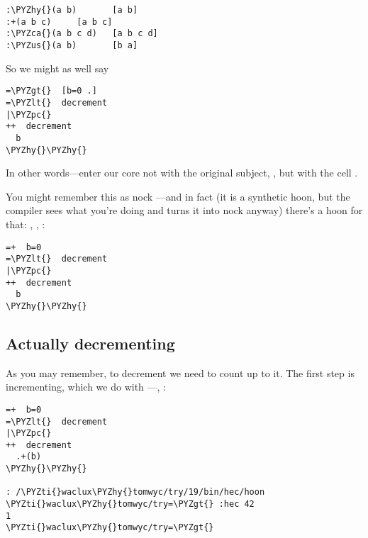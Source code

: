 \begin{framed_shaded}
\begin{Verbatim}[fontsize=\relsize{-2.5},fontseries=b,commandchars=\\\{\}]
:\PYZhy{}(a b)       [a b]
:+(a b c)     [a b c]
:\PYZca{}(a b c d)   [a b c d]
:\PYZus{}(a b)       [b a]
\end{Verbatim}
\end{framed_shaded}
So we might as well say
\begin{framed_shaded}
\begin{Verbatim}[fontsize=\relsize{-2.5},fontseries=b,commandchars=\\\{\}]
=\PYZgt{}  [b=0 .]
=\PYZlt{}  decrement
|\PYZpc{}
++  decrement
  b
\PYZhy{}\PYZhy{}
\end{Verbatim}
\end{framed_shaded}

In other words---enter our core not with the original subject,
, but with the cell \kode{[b=0 .]}.  

You might remember this as nock ---and in fact (it is a
synthetic hoon, but the compiler sees what you're doing and turns
it into nock  anyway) there's a hoon for that: \kode{=+}, ,
:
\begin{framed_shaded}
\begin{Verbatim}[fontsize=\relsize{-2.5},fontseries=b,commandchars=\\\{\}]
=+  b=0
=\PYZlt{}  decrement
|\PYZpc{}
++  decrement
  b
\PYZhy{}\PYZhy{}
\end{Verbatim}
\end{framed_shaded}

\subsection{Actually decrementing}

As you may remember, to decrement  we need to count up to it.
The first step is incrementing, which we do with ---, 
:
\begin{framed_shaded}
\begin{Verbatim}[fontsize=\relsize{-2.5},fontseries=b,commandchars=\\\{\}]
=+  b=0
=\PYZlt{}  decrement
|\PYZpc{}
++  decrement
  .+(b)
\PYZhy{}\PYZhy{}

: /\PYZti{}waclux\PYZhy{}tomwyc/try/19/bin/hec/hoon
\PYZti{}waclux\PYZhy{}tomwyc/try=\PYZgt{} :hec 42
1
\PYZti{}waclux\PYZhy{}tomwyc/try=\PYZgt{} 
\end{Verbatim}
\end{framed_shaded}

